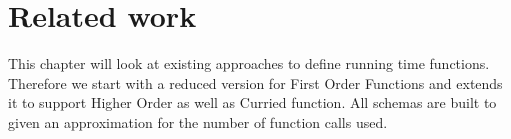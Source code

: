 
\chapter{Related work}\label{chapter:relwork}

This chapter will look at existing approaches to define running time functions.
Therefore we start with a reduced version for First Order Functions and extends it to support Higher Order as well as Curried function.
All schemas are built to given an approximation for the number of function calls used.




